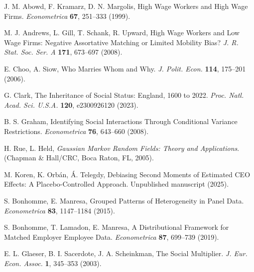 \documentclass[9pt,twocolumn,twoside]{pnas-new}
\begin{document}
\showmatmethods{}


\showacknow{}

\begin{thebibliography}{9}

J. M. Abowd, F. Kramarz, D. N. Margolis, 
High Wage Workers and High Wage Firms. 
\textit{Econometrica} \textbf{67}, 251--333 (1999).

M. J. Andrews, L. Gill, T. Schank, R. Upward, 
High Wage Workers and Low Wage Firms: Negative Assortative Matching or Limited Mobility Bias? 
\textit{J. R. Stat. Soc. Ser. A} \textbf{171}, 673--697 (2008).

E. Choo, A. Siow, 
Who Marries Whom and Why. 
\textit{J. Polit. Econ.} \textbf{114}, 175--201 (2006).

G. Clark, 
The Inheritance of Social Status: England, 1600 to 2022. 
\textit{Proc. Natl. Acad. Sci. U.S.A.} \textbf{120}, e2300926120 (2023).

B. S. Graham, 
Identifying Social Interactions Through Conditional Variance Restrictions. 
\textit{Econometrica} \textbf{76}, 643--660 (2008).

H. Rue, L. Held, 
\textit{Gaussian Markov Random Fields: Theory and Applications}. 
(Chapman \& Hall/CRC, Boca Raton, FL, 2005).

M. Koren, K. Orbán, Á. Telegdy, 
Debiasing Second Moments of Estimated CEO Effects: A Placebo-Controlled Approach. 
Unpublished manuscript (2025).

S. Bonhomme, E. Manresa, 
Grouped Patterns of Heterogeneity in Panel Data. 
\textit{Econometrica} \textbf{83}, 1147--1184 (2015).

S. Bonhomme, T. Lamadon, E. Manresa, 
A Distributional Framework for Matched Employer Employee Data. 
\textit{Econometrica} \textbf{87}, 699--739 (2019).

E. L. Glaeser, B. I. Sacerdote, J. A. Scheinkman, 
The Social Multiplier. 
\textit{J. Eur. Econ. Assoc.} \textbf{1}, 345--353 (2003).

\end{thebibliography}
\end{document}
